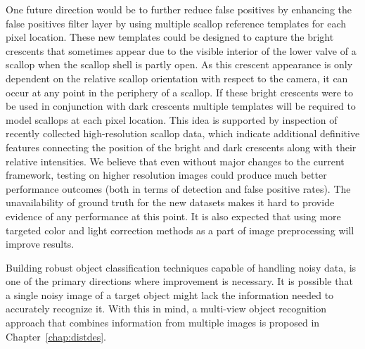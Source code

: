 \documentclass {udthesis}
\begin{document}
One future direction would be to further reduce false positives by enhancing the false positives filter layer by using multiple scallop reference templates for each pixel location. 
These new templates could be designed to capture the bright crescents that sometimes appear due to the visible interior of the lower valve of a scallop when the scallop shell is partly open. As this crescent appearance is only dependent on the relative scallop orientation with respect to the camera, it can occur at any point in the periphery of a scallop. If these bright crescents were to be used in conjunction with dark crescents multiple templates will be required to model scallops at each pixel location.
This idea is supported by inspection of recently collected high-resolution scallop data, which indicate additional definitive features connecting the position of the bright and dark crescents along with their relative intensities. 
We believe that even without major changes to the current framework, testing on higher resolution images could produce much better performance outcomes (both in terms of detection and false positive rates). 
The unavailability of ground truth for the new datasets makes it hard to provide evidence of any performance at this point. 
It is also expected that using more targeted color and light correction methods \cite{dawkings13} as a part of image preprocessing will improve results.

Building robust object classification techniques capable of handling noisy data, is one of the primary directions where improvement is necessary. It is possible that a single noisy image of a target object might lack the information needed to accurately recognize it. With this in mind, a multi-view object recognition approach that combines information from multiple images is proposed in Chapter~\ref{chap:distdes}.


\printglossary[type=\acronymtype]                  
\end{document}
